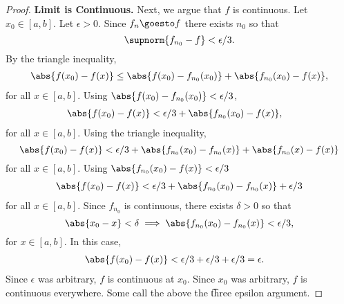 \begin{proof}
\textbf{Limit is Continuous.}
Next, we argue that $f$ is continuous.
Let $x_0 \in [a, b]$.
Let $\epsilon  > 0$.
Since $f_n \goesto f$ there exists
$n_0$ so that
\[
\supnorm{f_{n_0} - f} < \epsilon /3.
\]
By the triangle inequality,
\[
\begin{aligned}
\abs{f(x_0) - f(x)} \leq \abs{f(x_0) - f_{n_0}(x_0)} + \abs{f_{n_0}(x_0) - f(x)},
\end{aligned}
\]
for all $x \in [a, b]$.
Using $\abs{f(x_0) - f_{n_0}(x_0)} < \epsilon /3$,
\[
\begin{aligned}
\abs{f(x_0) - f(x)} &< \epsilon /3 + \abs{f_{n_0}(x_0) - f(x)},
\end{aligned}
\]
for all $x \in [a, b]$.
Using the triangle inequality,
\[
\abs{f(x_0) - f(x)} < \epsilon /3 + \abs{f_{n_0}(x_0) - f_{n_0}(x)} + \abs{f_{n_0}(x) - f(x)} \\
\]
for all $x \in [a, b]$.
Using $\abs{f_{n_0}(x_0) - f(x)} < \epsilon /3$
\[
\begin{aligned}
\abs{f(x_0) - f(x)} < \epsilon /3 + \abs{f_{n_0}(x_0) - f_{n_0}(x)} + \epsilon /3 \\
\end{aligned}
\]
for all $x \in [a, b]$.
Since $f_{n_0}$ is continuous, there exists $\delta  > 0$ so that
\[
\abs{x_0 - x} < \delta
\implies
\abs{f_{n_0}(x_0) - f_{n_0}(x)} < \epsilon /3,
\]
for $x \in [a, b]$.
In this case,
\[
\begin{aligned}
\abs{f(x_0) - f(x)} &< \epsilon /3 + \epsilon /3 + \epsilon /3 = \epsilon .
\end{aligned}
\]
Since $\epsilon $ was arbitrary, $f$ is continuous at $x_0$.
Since $x_0$ was arbitrary, $f$ is continuous everywhere.
Some call the above the \t{three epsilon argument}.
\end{proof}